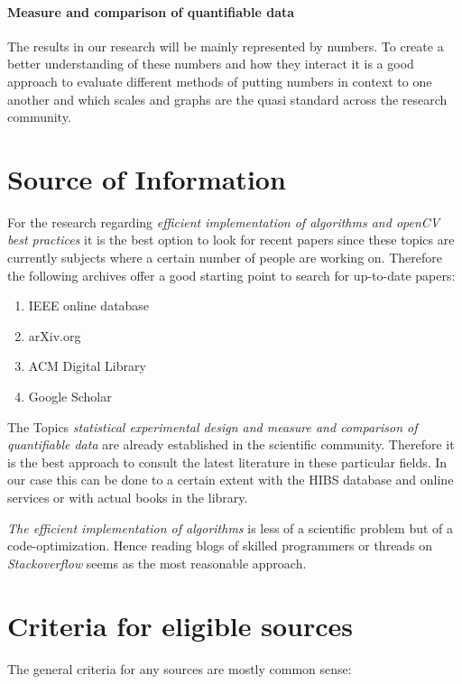 \documentclass[titlepage, a4paper, 11pt]{scrartcl}
\begin{document}
\paragraph{Measure and comparison of quantifiable data}

The results in our research will be mainly represented by numbers. To create a better understanding of these numbers and how they interact it is a good approach to 
evaluate different methods of putting numbers in context to one another and which scales and graphs are the quasi standard across the research community.


\section{Source of Information}

For the research regarding \textit{efficient implementation of algorithms and openCV best practices} it is the best option to look for recent papers since these topics are currently
subjects where a certain number of people are working on. Therefore the following archives offer a good starting point to search for up-to-date papers:

\begin{enumerate}
    \item IEEE online database
    \item arXiv.org
    \item ACM Digital Library
    \item Google Scholar
\end{enumerate}

The Topics \textit{statistical experimental design and measure and comparison of quantifiable data} are already established in the scientific community.
Therefore it is the best approach to consult the latest literature in these particular fields. In our case this can be done to a certain extent with the HIBS database
and online services or with actual books in the library.

\textit{The efficient implementation of algorithms} is less of a scientific problem but of a code-optimization. Hence reading blogs of skilled programmers or threads on
\textit{Stackoverflow} seems as the most reasonable approach.

\section{Criteria for eligible sources}

The general criteria for any sources are mostly common sense:
\end{document}
